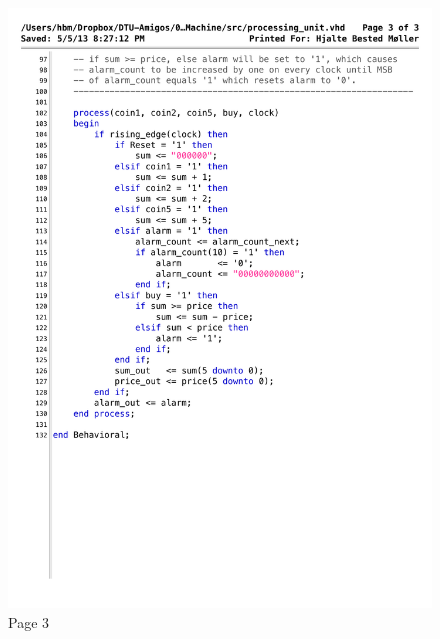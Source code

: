 \begin{figure}[!h]
\centering
\includegraphics[scale=0.6]{figs/processing_unit_3.pdf}
\caption{Page 3}
\label{vhd:proceunit3}
\end{figure}



